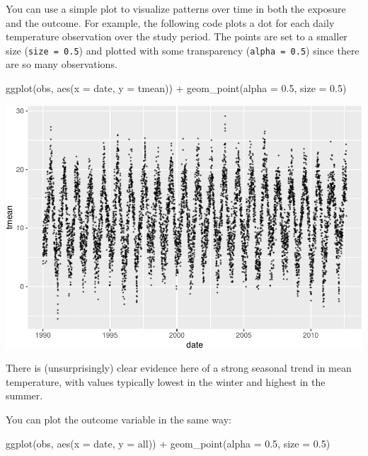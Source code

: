 \documentclass[
]{book}
\newenvironment{Shaded}{\begin{snugshade}}{\end{snugshade}}
\newcommand{\AttributeTok}[1]{\textcolor[rgb]{0.77,0.63,0.00}{#1}}
\newcommand{\FloatTok}[1]{\textcolor[rgb]{0.00,0.00,0.81}{#1}}
\newcommand{\FunctionTok}[1]{\textcolor[rgb]{0.00,0.00,0.00}{#1}}
\newcommand{\NormalTok}[1]{#1}
\newcommand{\SpecialCharTok}[1]{\textcolor[rgb]{0.00,0.00,0.00}{#1}}
\begin{document}
You can use a simple plot to visualize patterns over time in both the exposure
and the outcome. For example, the following code plots a dot for each daily
temperature observation over the study period. The points are set to a smaller
size (\texttt{size\ =\ 0.5}) and plotted with some transparency (\texttt{alpha\ =\ 0.5}) since
there are so many observations.

\begin{Shaded}
\begin{Highlighting}[]
\FunctionTok{ggplot}\NormalTok{(obs, }\FunctionTok{aes}\NormalTok{(}\AttributeTok{x =}\NormalTok{ date, }\AttributeTok{y =}\NormalTok{ tmean)) }\SpecialCharTok{+} 
  \FunctionTok{geom\_point}\NormalTok{(}\AttributeTok{alpha =} \FloatTok{0.5}\NormalTok{, }\AttributeTok{size =} \FloatTok{0.5}\NormalTok{)}
\end{Highlighting}
\end{Shaded}

\includegraphics{adv_epi_analysis_files/figure-latex/unnamed-chunk-10-1.pdf}

There is (unsurprisingly) clear evidence here of a strong seasonal trend in mean temperature,
with values typically lowest in the winter and highest in the summer.

You can plot the outcome variable in the same way:

\begin{Shaded}
\begin{Highlighting}[]
\FunctionTok{ggplot}\NormalTok{(obs, }\FunctionTok{aes}\NormalTok{(}\AttributeTok{x =}\NormalTok{ date, }\AttributeTok{y =}\NormalTok{ all)) }\SpecialCharTok{+} 
  \FunctionTok{geom\_point}\NormalTok{(}\AttributeTok{alpha =} \FloatTok{0.5}\NormalTok{, }\AttributeTok{size =} \FloatTok{0.5}\NormalTok{)}
\end{Highlighting}
\end{Shaded}
\end{document}
